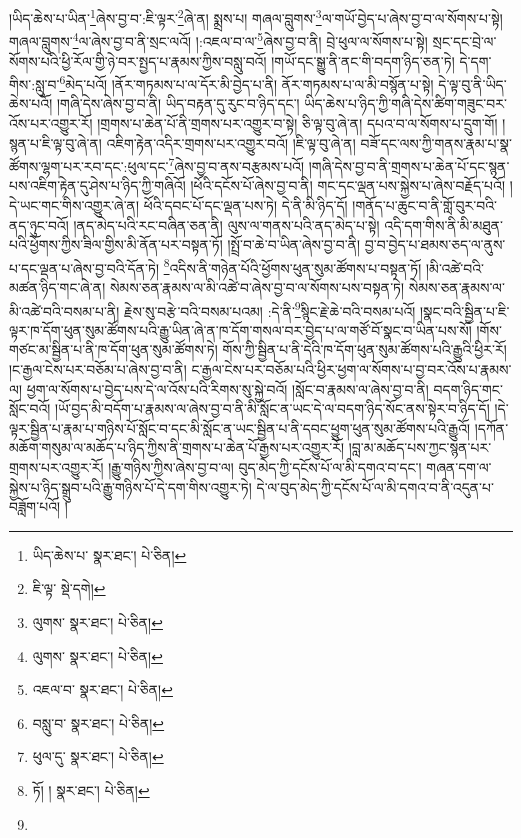 །ཡིད་ཆེས་པ་ཡིན་\footnote{ཡིད་ཆེས་པ་  སྣར་ཐང་།  པེ་ཅིན། }ཞེས་བྱ་བ་:ཇི་ལྟར་\footnote{ཇི་ལྟ་  སྡེ་དགེ། }ཞེ་ན། སྨྲས་པ། གཞལ་བླུགས་\footnote{ལུགས་  སྣར་ཐང་།  པེ་ཅིན། }ལ་གཡོ་བྱེད་པ་ཞེས་བྱ་བ་ལ་སོགས་པ་སྟེ། གཞལ་བླུགས་\footnote{ལུགས་  སྣར་ཐང་།  པེ་ཅིན། }ལ་ཞེས་བྱ་བ་ནི་སྲང་ལའོ། །:འཇལ་བ་ལ་\footnote{འཇལ་བ་  སྣར་ཐང་།  པེ་ཅིན། }ཞེས་བྱ་བ་ནི། བྲེ་ཕུལ་ལ་སོགས་པ་སྟེ། སྲང་དང་བྲེ་ལ་སོགས་པའི་ཕྱི་རོལ་གྱི་ཉེ་བར་སྤྱད་པ་རྣམས་ཀྱིས་བསླུ་བའོ། །གཡོ་དང་སྒྱུ་ནི་ནང་གི་བདག་ཉིད་ཅན་ཏེ། དེ་དག་གིས་:སླུ་བ་\footnote{བསླུ་བ་  སྣར་ཐང་།  པེ་ཅིན། }མེད་པའོ། །ནོར་གཏམས་པ་ལ་དོར་མི་བྱེད་པ་ནི། ནོར་གཏམས་པ་ལ་མི་བསྙོན་པ་སྟེ། དེ་ལྟ་བུ་ནི་ཡིད་ཆེས་པའོ། །གཞི་དེས་ཞེས་བྱ་བ་ནི། ཡིད་བརྟན་དུ་རུང་བ་ཉིད་དང་། ཡིད་ཆེས་པ་ཉིད་ཀྱི་གཞི་དེས་ཚིག་གཟུང་བར་འོས་པར་འགྱུར་རོ། །གྲགས་པ་ཆེན་པོ་ནི་གྲགས་པར་འགྱུར་བ་སྟེ། ཅི་ལྟ་བུ་ཞེ་ན། དཔའ་བ་ལ་སོགས་པ་དྲུག་གོ། །སྙན་པ་ཇི་ལྟ་བུ་ཞེ་ན། འཇིག་རྟེན་འདིར་གྲགས་པར་འགྱུར་བའོ། །ཇི་ལྟ་བུ་ཞེ་ན། བཟོ་དང་ལས་ཀྱི་གནས་རྣམ་པ་སྣ་ཚོགས་ལྷག་པར་རབ་དང་:ཕུལ་དང་\footnote{ཕུལ་དུ་  སྣར་ཐང་།  པེ་ཅིན། }ཞེས་བྱ་བ་ནས་བརྩམས་པའོ། །གཞི་དེས་བྱ་བ་ནི་གྲགས་པ་ཆེན་པོ་དང་སྙན་པས་འཇིག་རྟེན་དུ་ཤེས་པ་ཉིད་ཀྱི་གཞིའོ། །ཕོའི་དངོས་པོ་ཞེས་བྱ་བ་ནི། གང་དང་ལྡན་པས་སྐྱེས་པ་ཞེས་བརྗོད་པའོ། །དེ་ཡང་གང་གིས་འགྱུར་ཞེ་ན། ཕོའི་དབང་པོ་དང་ལྡན་པས་ཏེ། དེ་ནི་མི་ཉིད་དོ། །གནོད་པ་ཆུང་བ་ནི་གློ་བུར་བའི་ནད་ཉུང་བའོ། །ནད་མེད་པའི་རང་བཞིན་ཅན་ནི། ལུས་ལ་གནས་པའི་ནད་མེད་པ་སྟེ། འདི་དག་གིས་ནི་མི་མཐུན་པའི་ཕྱོགས་ཀྱིས་ཟིལ་གྱིས་མི་ནོན་པར་བསྟན་ཏོ། །སྤྲོ་བ་ཆེ་བ་ཡིན་ཞེས་བྱ་བ་ནི། བྱ་བ་བྱེད་པ་ཐམས་ཅད་ལ་ནུས་པ་དང་ལྡན་པ་ཞེས་བྱ་བའི་དོན་ཏེ། \footnote{ཏོ། །   སྣར་ཐང་།  པེ་ཅིན། }འདིས་ནི་གཉེན་པོའི་ཕྱོགས་ཕུན་སུམ་ཚོགས་པ་བསྟན་ཏོ། །མི་འཚེ་བའི་མཚན་ཉིད་གང་ཞེ་ན། སེམས་ཅན་རྣམས་ལ་མི་འཚེ་བ་ཞེས་བྱ་བ་ལ་སོགས་པས་བསྟན་ཏེ། སེམས་ཅན་རྣམས་ལ་མི་འཚེ་བའི་བསམ་པ་ནི། རྗེས་སུ་བརྩེ་བའི་བསམ་པའམ། :དེ་ནི་\footnote{}སྙིང་རྗེ་ཆེ་བའི་བསམ་པའོ། །སྣང་བའི་སྦྱིན་པ་ཇི་ལྟར་ཁ་དོག་ཕུན་སུམ་ཚོགས་པའི་རྒྱུ་ཡིན་ཞེ་ན་ཁ་དོག་གསལ་བར་བྱེད་པ་ལ་གཙོ་བོ་སྣང་བ་ཡིན་པས་སོ། །གོས་གཙང་མ་སྦྱིན་པ་ནི་ཁ་དོག་ཕུན་སུམ་ཚོགས་ཏེ། གོས་ཀྱི་སྦྱིན་པ་ནི་དེའི་ཁ་དོག་ཕུན་སུམ་ཚོགས་པའི་རྒྱུའི་ཕྱིར་རོ། །ང་རྒྱལ་ངེས་པར་བཅོམ་པ་ཞེས་བྱ་བ་ནི། ང་རྒྱལ་ངེས་པར་བཅོམ་པའི་ཕྱིར་ཕྱག་ལ་སོགས་པ་བྱ་བར་འོས་པ་རྣམས་ལ། ཕྱག་ལ་སོགས་པ་བྱེད་པས་དེ་ལ་འོས་པའི་རིགས་སུ་སྐྱེ་བའོ། །སློང་བ་རྣམས་ལ་ཞེས་བྱ་བ་ནི། བདག་ཉིད་གང་སློང་བའོ། །ཡོ་བྱད་མི་བདོག་པ་རྣམས་ལ་ཞེས་བྱ་བ་ནི་མི་སློང་ན་ཡང་དེ་ལ་བདག་ཉིད་སོང་ནས་སྟེར་བ་ཉིད་དོ། །དེ་ལྟར་སྦྱིན་པ་རྣམ་པ་གཉིས་པོ་སློང་བ་དང་མི་སློང་ན་ཡང་སྦྱིན་པ་ནི་དབང་ཕྱུག་ཕུན་སུམ་ཚོགས་པའི་རྒྱུའོ། །དཀོན་མཆོག་གསུམ་ལ་མཆོད་པ་ཉིད་ཀྱིས་ནི་གྲགས་པ་ཆེན་པོ་རྒྱས་པར་འགྱུར་རོ། །བླ་མ་མཆོད་པས་ཀྱང་སྙན་པར་གྲགས་པར་འགྱུར་རོ། །རྒྱུ་གཉིས་ཀྱིས་ཞེས་བྱ་བ་ལ། བུད་མེད་ཀྱི་དངོས་པོ་ལ་མི་དགའ་བ་དང་། གཞན་དག་ལ་སྐྱེས་པ་ཉིད་སྒྲུབ་པའི་རྒྱུ་གཉིས་པོ་དེ་དག་གིས་འགྱུར་ཏེ། དེ་ལ་བུད་མེད་ཀྱི་དངོས་པོ་ལ་མི་དགའ་བ་ནི་འདུན་པ་བཟློག་པའོ། །
